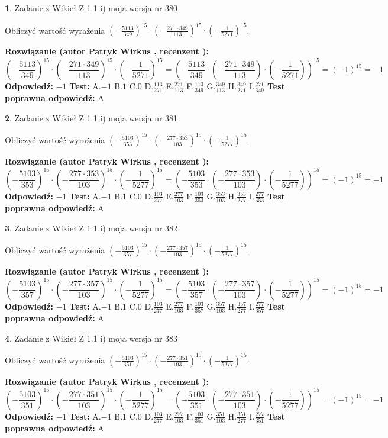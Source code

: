 \documentclass[12pt, a4paper]{article}
\theoremstyle{definition} %
\newtheorem{zad}{}
\newcommand{\zadStart}[1]{\begin{zad}#1\newline}
\newcommand{\zadStop}{\end{zad}}
\newcommand{\rozwStart}[2]{\noindent \textbf{Rozwiązanie (autor #1 , recenzent #2): }\newline}
\newcommand{\rozwStop}{\newline}
\newcommand{\odpStart}{\noindent \textbf{Odpowiedź:}\newline}
\newcommand{\odpStop}{\newline}
\newcommand{\testStart}{\noindent \textbf{Test:}\newline}
\newcommand{\testStop}{\newline}
\newcommand{\kluczStart}{\noindent \textbf{Test poprawna odpowiedź:}\newline}
\newcommand{\kluczStop}{\newline}
\begin{document}
\zadStart{Zadanie z Wikieł Z 1.1 i) moja wersja nr 380}

Obliczyć wartość wyrażenia $(-\frac{5113}{349})^{15} \cdot (-\frac{271 \cdot 349}{113})^{15} \cdot (-\frac{1}{5271})^{15}$.
\zadStop
\rozwStart{Patryk Wirkus}{}
$$(-\frac{5113}{349})^{15} \cdot (-\frac{271 \cdot 349}{113})^{15} \cdot (-\frac{1}{5271})^{15} = (-\frac{5113}{349} \cdot (-\frac{271 \cdot 349}{113}) \cdot (-\frac{1}{5271}))^{15} = (-1)^{15} = -1$$
\rozwStop
\odpStart
$-1$
\odpStop
\testStart
A.$-1$ B.$1$ C.$0$ D.$\frac{113}{271}$ E.$\frac{271}{113}$
F.$\frac{113}{349}$ G.$\frac{349}{113}$
H.$\frac{349}{271}$
I.$\frac{271}{349}$
\testStop
\kluczStart
A
\kluczStop



\zadStart{Zadanie z Wikieł Z 1.1 i) moja wersja nr 381}

Obliczyć wartość wyrażenia $(-\frac{5103}{353})^{15} \cdot (-\frac{277 \cdot 353}{103})^{15} \cdot (-\frac{1}{5277})^{15}$.
\zadStop
\rozwStart{Patryk Wirkus}{}
$$(-\frac{5103}{353})^{15} \cdot (-\frac{277 \cdot 353}{103})^{15} \cdot (-\frac{1}{5277})^{15} = (-\frac{5103}{353} \cdot (-\frac{277 \cdot 353}{103}) \cdot (-\frac{1}{5277}))^{15} = (-1)^{15} = -1$$
\rozwStop
\odpStart
$-1$
\odpStop
\testStart
A.$-1$ B.$1$ C.$0$ D.$\frac{103}{277}$ E.$\frac{277}{103}$
F.$\frac{103}{353}$ G.$\frac{353}{103}$
H.$\frac{353}{277}$
I.$\frac{277}{353}$
\testStop
\kluczStart
A
\kluczStop



\zadStart{Zadanie z Wikieł Z 1.1 i) moja wersja nr 382}

Obliczyć wartość wyrażenia $(-\frac{5103}{357})^{15} \cdot (-\frac{277 \cdot 357}{103})^{15} \cdot (-\frac{1}{5277})^{15}$.
\zadStop
\rozwStart{Patryk Wirkus}{}
$$(-\frac{5103}{357})^{15} \cdot (-\frac{277 \cdot 357}{103})^{15} \cdot (-\frac{1}{5277})^{15} = (-\frac{5103}{357} \cdot (-\frac{277 \cdot 357}{103}) \cdot (-\frac{1}{5277}))^{15} = (-1)^{15} = -1$$
\rozwStop
\odpStart
$-1$
\odpStop
\testStart
A.$-1$ B.$1$ C.$0$ D.$\frac{103}{277}$ E.$\frac{277}{103}$
F.$\frac{103}{357}$ G.$\frac{357}{103}$
H.$\frac{357}{277}$
I.$\frac{277}{357}$
\testStop
\kluczStart
A
\kluczStop



\zadStart{Zadanie z Wikieł Z 1.1 i) moja wersja nr 383}

Obliczyć wartość wyrażenia $(-\frac{5103}{351})^{15} \cdot (-\frac{277 \cdot 351}{103})^{15} \cdot (-\frac{1}{5277})^{15}$.
\zadStop
\rozwStart{Patryk Wirkus}{}
$$(-\frac{5103}{351})^{15} \cdot (-\frac{277 \cdot 351}{103})^{15} \cdot (-\frac{1}{5277})^{15} = (-\frac{5103}{351} \cdot (-\frac{277 \cdot 351}{103}) \cdot (-\frac{1}{5277}))^{15} = (-1)^{15} = -1$$
\rozwStop
\odpStart
$-1$
\odpStop
\testStart
A.$-1$ B.$1$ C.$0$ D.$\frac{103}{277}$ E.$\frac{277}{103}$
F.$\frac{103}{351}$ G.$\frac{351}{103}$
H.$\frac{351}{277}$
I.$\frac{277}{351}$
\testStop
\kluczStart
A
\kluczStop
\end{document}
